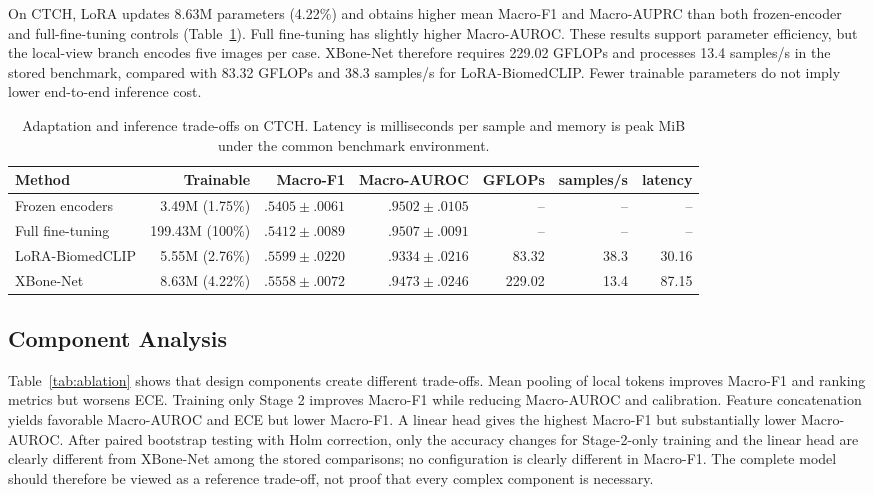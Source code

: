\documentclass[runningheads]{llncs}
\begin{document}
On CTCH, LoRA updates 8.63M parameters (4.22\%) and obtains higher mean Macro-F1 and Macro-AUPRC than both frozen-encoder and full-fine-tuning controls (Table~\ref{tab:adapt}). Full fine-tuning has slightly higher Macro-AUROC. These results support parameter efficiency, but the local-view branch encodes five images per case. XBone-Net therefore requires 229.02 GFLOPs and processes 13.4 samples/s in the stored benchmark, compared with 83.32 GFLOPs and 38.3 samples/s for LoRA-BiomedCLIP. Fewer trainable parameters do not imply lower end-to-end inference cost.

\begin{table}[t]
\caption{Adaptation and inference trade-offs on CTCH. Latency is milliseconds per sample and memory is peak MiB under the common benchmark environment.}
\label{tab:adapt}
\centering
\scriptsize
\begin{tabular}{lrrrrrr}
\toprule
Method & Trainable & Macro-F1 & Macro-AUROC & GFLOPs & samples/s & latency \\
\midrule
Frozen encoders & 3.49M (1.75\%) & $.5405\pm.0061$ & $.9502\pm.0105$ & -- & -- & -- \\
Full fine-tuning & 199.43M (100\%) & $.5412\pm.0089$ & $\mathbf{.9507\pm.0091}$ & -- & -- & -- \\
LoRA-BiomedCLIP & 5.55M (2.76\%) & $.5599\pm.0220$ & $.9334\pm.0216$ & 83.32 & 38.3 & 30.16 \\
XBone-Net & 8.63M (4.22\%) & $.5558\pm.0072$ & $.9473\pm.0246$ & 229.02 & 13.4 & 87.15 \\
\bottomrule
\end{tabular}
\end{table}

\subsection{Component Analysis}

Table~\ref{tab:ablation} shows that design components create different trade-offs. Mean pooling of local tokens improves Macro-F1 and ranking metrics but worsens ECE. Training only Stage 2 improves Macro-F1 while reducing Macro-AUROC and calibration. Feature concatenation yields favorable Macro-AUROC and ECE but lower Macro-F1. A linear head gives the highest Macro-F1 but substantially lower Macro-AUROC. After paired bootstrap testing with Holm correction, only the accuracy changes for Stage-2-only training and the linear head are clearly different from XBone-Net among the stored comparisons; no configuration is clearly different in Macro-F1. The complete model should therefore be viewed as a reference trade-off, not proof that every complex component is necessary.
\end{document}
